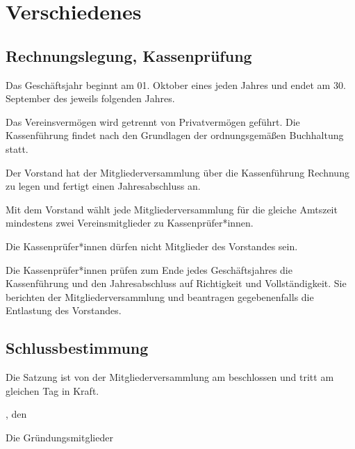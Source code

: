\chapter{Verschiedenes}

\section{Rechnungslegung, Kassenprüfung}
\begin{absätze}
	\item Das Geschäftsjahr beginnt am 01. Oktober eines jeden Jahres und endet am 30. September des jeweils folgenden Jahres.
	\item Das Vereinsvermögen wird getrennt von Privatvermögen geführt. Die Kassenführung findet nach den Grundlagen der ordnungsgemäßen Buchhaltung statt.
	\item Der Vorstand hat der Mitgliederversammlung über die Kassenführung Rechnung zu legen und fertigt einen Jahresabschluss an.
	\item Mit dem Vorstand wählt jede Mitgliederversammlung für die gleiche Amtszeit mindestens zwei Vereinsmitglieder zu Kassenprüfer*innen. 
	\item Die Kassenprüfer*innen dürfen nicht Mitglieder des Vorstandes sein. 
    \item Die Kassenprüfer*innen prüfen zum Ende jedes Geschäftsjahres die Kassenführung und den Jahresabschluss auf Richtigkeit und Vollständigkeit. Sie berichten der Mitgliederversammlung und beantragen gegebenenfalls die Entlastung des Vorstandes.
\end{absätze}

\section{Schlussbestimmung}
Die Satzung ist von der Mitgliederversammlung am \DatumSatzung{} beschlossen und tritt am gleichen Tag in Kraft.

\vfill %

\Stadt{}, den \DatumSatzung{}

Die Gründungsmitglieder
